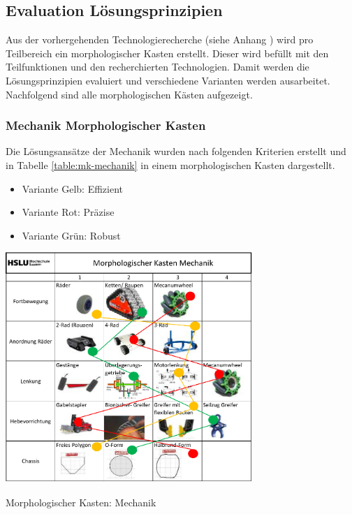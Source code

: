 \subsection*{Evaluation Lösungsprinzipien}\label{mk}


Aus der vorhergehenden Technologierecherche (siehe Anhang ) wird pro Teilbereich ein morphologischer Kasten erstellt. Dieser wird befüllt mit den Teilfunktionen und den recherchierten Technologien. Damit werden die Lösungsprinzipien evaluiert und verschiedene Varianten werden ausarbeitet. Nachfolgend sind alle morphologischen Kästen aufgezeigt.

\subsubsection*{Mechanik Morphologischer Kasten}

Die Lösungsansätze der Mechanik wurden nach folgenden Kriterien erstellt und in Tabelle \ref{table:mk-mechanik} in einem morphologischen Kasten dargestellt.

\begin{itemize}
    \item Variante Gelb: Effizient
    \item Variante Rot: Präzise
    \item Variante Grün: Robust
\end{itemize}

\begin{table}[H]
\centering
\includegraphics[width=0.7\textwidth]{assets/MK_Maschinentechnik.pdf}
\caption{Morphologischer Kasten: Mechanik}
\label{table:mk-mechanik}
\end{table}


